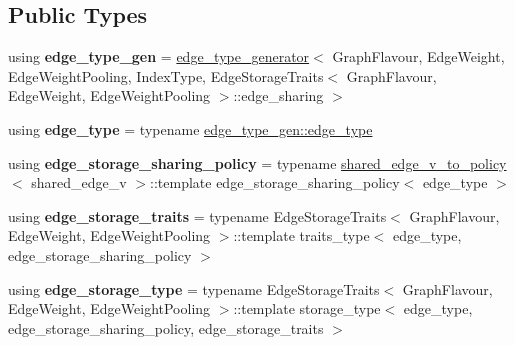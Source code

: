 \subsection*{Public Types}
\begin{DoxyCompactItemize}
\item 
\mbox{\label{structsequoia_1_1maths_1_1graph__impl_1_1dynamic__edge__traits_a590051402918e12d2dc78625ff5cd4eb}} 
using {\bfseries edge\+\_\+type\+\_\+gen} = \mbox{\hyperlink{structsequoia_1_1maths_1_1graph__impl_1_1edge__type__generator}{edge\+\_\+type\+\_\+generator}}$<$ Graph\+Flavour, Edge\+Weight, Edge\+Weight\+Pooling, Index\+Type, Edge\+Storage\+Traits$<$ Graph\+Flavour, Edge\+Weight, Edge\+Weight\+Pooling $>$\+::edge\+\_\+sharing $>$
\item 
\mbox{\label{structsequoia_1_1maths_1_1graph__impl_1_1dynamic__edge__traits_ada4f0120b281cf0b0bd386a4c2753887}} 
using {\bfseries edge\+\_\+type} = typename \mbox{\hyperlink{classsequoia_1_1maths_1_1partial__edge}{edge\+\_\+type\+\_\+gen\+::edge\+\_\+type}}
\item 
\mbox{\label{structsequoia_1_1maths_1_1graph__impl_1_1dynamic__edge__traits_a21c44b080625b3a66ff6a29d971b7d61}} 
using {\bfseries edge\+\_\+storage\+\_\+sharing\+\_\+policy} = typename \mbox{\hyperlink{structsequoia_1_1maths_1_1graph__impl_1_1shared__edge__v__to__policy}{shared\+\_\+edge\+\_\+v\+\_\+to\+\_\+policy}}$<$ shared\+\_\+edge\+\_\+v $>$\+::template edge\+\_\+storage\+\_\+sharing\+\_\+policy$<$ edge\+\_\+type $>$
\item 
\mbox{\label{structsequoia_1_1maths_1_1graph__impl_1_1dynamic__edge__traits_a58728717c0d38eb2b69ed1ac2361d7b4}} 
using {\bfseries edge\+\_\+storage\+\_\+traits} = typename Edge\+Storage\+Traits$<$ Graph\+Flavour, Edge\+Weight, Edge\+Weight\+Pooling $>$\+::template traits\+\_\+type$<$ edge\+\_\+type, edge\+\_\+storage\+\_\+sharing\+\_\+policy $>$
\item 
\mbox{\label{structsequoia_1_1maths_1_1graph__impl_1_1dynamic__edge__traits_abe7ac92f1ca2c7c9d0048124a4d5b761}} 
using {\bfseries edge\+\_\+storage\+\_\+type} = typename Edge\+Storage\+Traits$<$ Graph\+Flavour, Edge\+Weight, Edge\+Weight\+Pooling $>$\+::template storage\+\_\+type$<$ edge\+\_\+type, edge\+\_\+storage\+\_\+sharing\+\_\+policy, edge\+\_\+storage\+\_\+traits $>$
\end{DoxyCompactItemize}
